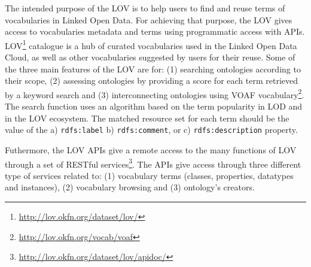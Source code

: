 The intended purpose of the LOV \cite{vandenbusschelov} is to help users to find and reuse terms of vocabularies in Linked Open Data. For achieving that purpose, the LOV gives access to vocabularies metadata and terms using programmatic access with APIs.  
LOV\footnote{\url{http://lov.okfn.org/dataset/lov/}} catalogue is a hub of curated vocabularies used in the Linked Open Data Cloud, as well as other vocabularies suggested by users for their reuse. 
Some of the three main features of the LOV are for: (1) searching ontologies according to their scope, (2) assessing ontologies by providing a score for each term retrieved by a keyword search and (3) interconnecting ontologies using VOAF vocabulary\footnote{\url{http://lov.okfn.org/vocab/voaf}}.
The search function uses an algorithm based on the term
popularity in LOD and in the LOV ecosystem. The matched resource set for each term should be the value of the a) {\tt rdfs:label} b) {\tt rdfs:comment}, or c) {\tt rdfs:description} property.


Futhermore, the LOV APIs give a remote access to the many functions of LOV through a set of RESTful services\footnote{\url{http://lov.okfn.org/dataset/lov/apidoc/}}. %
The APIs give access through three different type of services related to: (1) vocabulary terms (classes, properties, datatypes and instances), (2) vocabulary browsing and (3) ontology's creators. 



